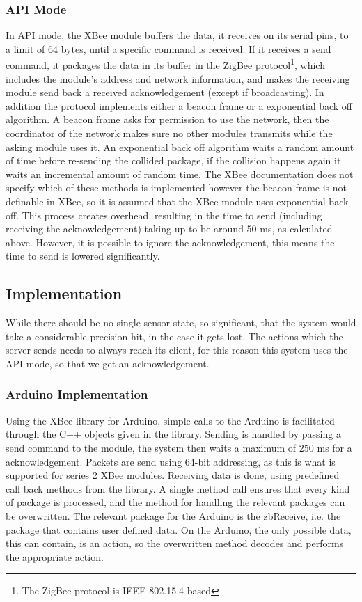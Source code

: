 \subsubsection{API Mode}
In API mode, the XBee module buffers the data, it receives on its serial pins, to a limit of 64 bytes, until a specific command is received. If it receives a send command, it packages the data in its buffer in the ZigBee protocol\footnote{The ZigBee protocol is IEEE 802.15.4 based}, which includes the module's address and network information, and makes the receiving module send back a received acknowledgement (except if broadcasting). In addition the protocol implements either a beacon frame or a exponential back off algorithm. A beacon frame asks for permission to use the network, then the coordinator of the network makes sure no other modules transmits while the asking module uses it. An exponential back off algorithm waits a random amount of time before re-sending the collided package, if the collision happens again it waits an incremental amount of random time. The XBee documentation does not specify which of these methods is implemented however the beacon frame is not definable in XBee, so it is assumed that the XBee module uses exponential back off. This process creates overhead, resulting in the time to send (including receiving the acknowledgement) taking up to be around $50$ ms, as calculated above. However, it is possible to ignore the acknowledgement, this means the time to send is lowered significantly.

\subsection{Implementation}
While there should be no single sensor state, so significant, that the system would take a considerable precision hit, in the case it gets lost. The actions which the server sends needs to always reach its client, for this reason this system uses the API mode, so that we get an acknowledgement.

\subsubsection{Arduino Implementation}
Using the XBee library\cite{xbee_arduino_library} for Arduino, simple calls to the Arduino is facilitated through the C++ objects given in the library. Sending is handled by passing a send command  to the module, the system then waits a maximum of 250 ms for a acknowledgement. Packets are send using 64-bit addressing, as this is what is supported for series 2 XBee modules.
Receiving data is done, using predefined call back methods from the library. A single method call ensures that every kind of package is processed, and the method for handling the relevant packages can be overwritten. The relevant package for the Arduino is the zbReceive, i.e. the package that contains user defined data. On the Arduino, the only possible data, this can contain, is an action, so the overwritten method decodes and performs the appropriate action.
